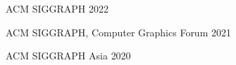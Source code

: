 
\begin{cvhonors}

    \cvhonor
	{ACM SIGGRAPH}
	{}
	{}
	{2022}
	
    \cvhonor
	{ACM SIGGRAPH, Computer Graphics Forum}
	{}
	{}
	{2021}
	
	\cvhonor
	{ACM SIGGRAPH Asia}
	{}
	{}
	{2020}

	
\end{cvhonors}